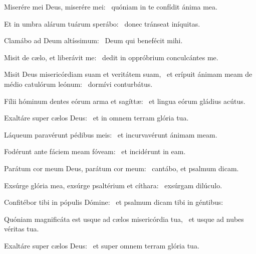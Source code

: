 \item Miserére mei Deus, miserére mei:~\psstar{} quóniam in te confídit ánima mea.

\item Et in umbra alárum tuárum sperábo:~\psstar{} donec tránseat iníquitas.

\item Clamábo ad Deum altíssi\-mum:~\psstar{} Deum qui benefécit mihi.

\item Misit de cælo, et liberávit me:~\psstar{} dedit in oppróbrium conculcántes me.

\item Misit Deus misericórdiam suam et veritátem suam,~\pscross{} et erípuit ánimam meam de médio catulórum leónum:~\psstar{} dormívi conturbátus.

\item Fílii hóminum dentes eórum arma et sagíttæ:~\psstar{} et lingua eórum gládius acútus.

\item Exaltáre super cælos Deus:~\psstar{} et in omnem terram glória tua.

\item Láqueum paravérunt pédibus meis:~\psstar{} et incurvavérunt ánimam meam.

\item Fodérunt ante fáciem meam fóveam:~\psstar{} et incidérunt in eam.

\item Parátum cor meum Deus, parátum cor meum:~\psstar{} cantábo, et psalmum dicam.

\item Exsúrge glória mea, exsúrge psaltérium et cíthara:~\psstar{} exsúrgam dilúculo.

\item Confitébor tibi in pópulis Dómine:~\psstar{} et psalmum dicam tibi in géntibus:

\item Quóniam magnificáta est usque ad cælos misericórdia tua,~\psstar{} et usque ad nubes véritas tua.

\item Exaltáre super cælos Deus:~\psstar{} et super omnem terram glória tua.

